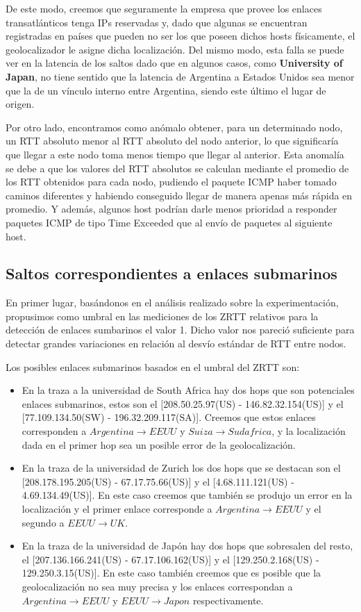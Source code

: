\documentclass[10pt, a4paper]{article}
\begin{document}
De este modo, creemos que seguramente la empresa que provee los enlaces transatlánticos tenga IPs reservadas y, dado que algunas se encuentran registradas en países que pueden no ser los que poseen dichos hosts físicamente, el geolocalizador le asigne dicha localización. Del mismo modo, esta falla se puede ver en la latencia de los saltos dado que en algunos casos, como \textbf{University of Japan}, no tiene sentido que la latencia de Argentina a Estados Unidos sea menor que la de un vínculo interno entre Argentina, siendo este último el lugar de origen.

Por otro lado, encontramos como anómalo obtener, para un determinado nodo, un RTT absoluto menor al RTT absoluto del nodo anterior, lo que significaría que llegar a este nodo toma menos tiempo que llegar al anterior. Esta anomalía se debe a que los valores del RTT absolutos se calculan mediante el promedio de los RTT obtenidos para cada nodo, pudiendo el paquete ICMP haber tomado caminos diferentes y habiendo conseguido llegar de manera apenas más rápida en promedio. Y además, algunos host podrían darle menos prioridad a responder paquetes ICMP de tipo Time Exceeded que al envío de paquetes al siguiente host.

\subsection{Saltos correspondientes a enlaces submarinos}

En primer lugar, basándonos en el análisis realizado sobre la experimentación, propusimos como umbral en las mediciones de los ZRTT relativos para la detección de enlaces sumbarinos el valor 1. Dicho valor nos pareció suficiente para detectar grandes variaciones en relación al desvío estándar de RTT entre nodos.

Los posibles enlaces submarinos basados en el umbral del ZRTT son:
\begin{itemize}
\item En la traza a la universidad de South Africa hay dos hops que son potenciales enlaces submarinos, estos son el [208.50.25.97(US) - 146.82.32.154(US)] y el [77.109.134.50(SW) - 196.32.209.117(SA)]. Creemos que estos enlaces corresponden a $Argentina \rightarrow EEUU$ y $Suiza \rightarrow Sudafrica$, y la localización dada en el primer hop sea un posible error de la geolocalización.

\item En la traza de la universidad de Zurich los dos hops que se destacan son el [208.178.195.205(US) - 67.17.75.66(US)] y el [4.68.111.121(US) - 4.69.134.49(US)]. En este caso creemos que también se produjo un error en la localización y el primer enlace corresponde a $Argentina \rightarrow EEUU$  y el segundo a $EEUU \rightarrow UK$.

\item En la traza de la universidad de Japón hay dos hops que sobresalen del resto, el [207.136.166.241(US) - 67.17.106.162(US)] y el [129.250.2.168(US) - 129.250.3.15(US)]. En este caso también creemos que es posible que la geolocalización no sea muy precisa y los enlaces correspondan a $Argentina \rightarrow EEUU$ y $EEUU \rightarrow Japon$ respectivamente.
\end{itemize}
\end{document}
